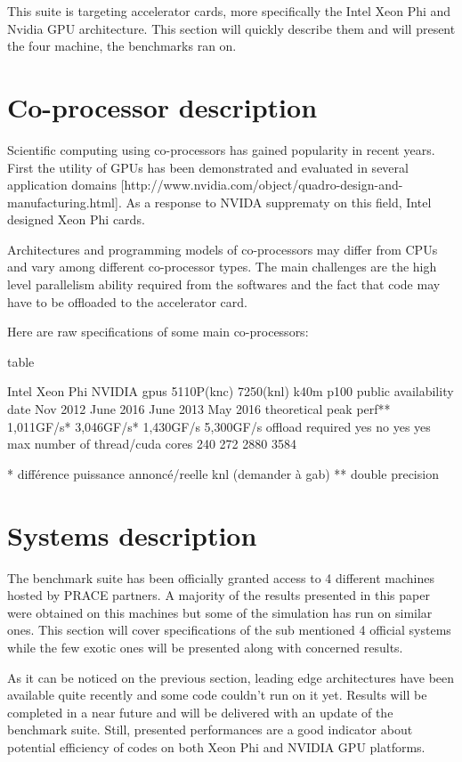 This suite is targeting accelerator cards, more specifically the Intel Xeon Phi and Nvidia GPU architecture. This section will quickly describe them and will present the four machine, the benchmarks ran on.

\section{Co-processor description}
Scientific computing using co-processors has gained popularity in recent years. First the utility of GPUs has been demonstrated and evaluated in several application domains [http://www.nvidia.com/object/quadro-design-and-manufacturing.html]. As a response to NVIDA supprematy on this field, Intel designed Xeon Phi cards.

Architectures and programming models of co-processors may differ from CPUs and vary among different co-processor types. The main challenges are the high level parallelism ability required from the softwares and the fact that code may have to be offloaded to the accelerator card.

Here are raw specifications of some main co-processors:

table

      Intel Xeon Phi    NVIDIA gpus
   5110P(knc) 7250(knl) k40m p100
public availability date Nov 2012 June 2016 June 2013 May 2016
theoretical peak perf** 1,011GF/s* 3,046GF/s* 1,430GF/s 5,300GF/s
offload required yes no yes yes
max number of thread/cuda cores 240 272 2880 3584

* différence puissance annoncé/reelle knl (demander à gab)
** double precision

\section{Systems description}

The benchmark suite has been officially granted access to 4 different machines hosted by PRACE partners. A majority of the results presented in this paper were obtained on this machines but some of the simulation has run on similar ones. This section will cover specifications of the sub mentioned 4 official systems while the few exotic ones will be presented along with concerned results.

As it can be noticed on the previous section, leading edge architectures have been available quite recently and some code couldn't run on it yet. Results will be completed in a near future and will be delivered with an update of the benchmark suite. Still, presented performances are a good indicator about potential efficiency of codes on both Xeon Phi and NVIDIA GPU platforms.

